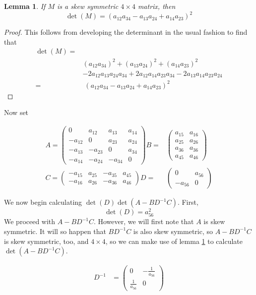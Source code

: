 \documentclass{article}
\renewcommand{\a}[1]{a_{#1}}
\newtheorem{lemma}[theorem]{Lemma}
\newcommand{\A}{\begin{pmatrix}
0 & a_{12} & a_{13} & a_{14} \\
-a_{12} & 0 & a_{23} & a_{24} \\
-a_{13} & -a_{23} & 0 & a_{34} \\
-a_{14} & -a_{24} & -a_{34} & 0
\end{pmatrix}}
\newcommand{\B}{\begin{pmatrix}
a_{15} & a_{16} \\
a_{25} & a_{26} \\
a_{36} & a_{36} \\
a_{45} & a_{46}
\end{pmatrix}}
\newcommand{\C}{
\begin{pmatrix}
-a_{15} & a_{25} & -a_{35} & a_{45} \\
-a_{16} & a_{26} & -a_{36} & a_{46}
\end{pmatrix}}
\newcommand{\D}{
\begin{pmatrix}
0 & a_{56} \\
-a_{56} & 0
\end{pmatrix}}
\begin{document}
\begin{lemma}\label{square}
  If $M$ is a skew symmetric $4 \times 4$ matrix, then
  $$\det(M) = (\a{12} \a{34} - \a{13} \a{24} + \a{14} \a{23})^2$$ 
\end{lemma}
\begin{proof}
  This follows from developing the determinant in the usual fashion to find that
  \begin{equation*}
    \begin{split}
    \det(M) =& \\
    &(\a{12}\a{34})^2 + (\a{13}\a{24})^2 + (\a{14}\a{23})^2 \\
    &- 2\a{12}\a{13}\a{24}\a{34} + 2\a{12}\a{14}\a{23}\a{34} - 2 \a{13}\a{14}\a{23}\a{24}\\
    =&\;(\a{12} \a{34} - \a{13} \a{24} + \a{14} \a{23})^2
    \end{split}
\end{equation*}
\end{proof}

Now set

\begin{equation*}
\begin{split}
A = \A
B = &\B\\
C = \C
D = &\D
\end{split}
\end{equation*}

We now begin calculating $\det(D)\det(A - BD^{-1}C)$. First,
\begin{equation}\label{det_D}
  \det(D) = \a{56}^2
\end{equation}
We proceed with $A - BD^{-1}C$. However, we will first note that $A$ is
skew symmetric. It will so happen that $BD^{-1}C$ is also skew symmetric, so $A
- BD^{-1}C$ is skew symmetric, too, and $4 \times 4$, so we can make use of
lemma \ref{square} to calculate $\det(A - BD^{-1}C)$.

\begin{equation*}
  \begin{split}
D^{-1} &=
\begin{pmatrix}
0 & -\frac{1}{a_{56}} \\
\frac{1}{a_{56}} & 0
\end{pmatrix}
\end{split}
\end{equation*}
\end{document}
